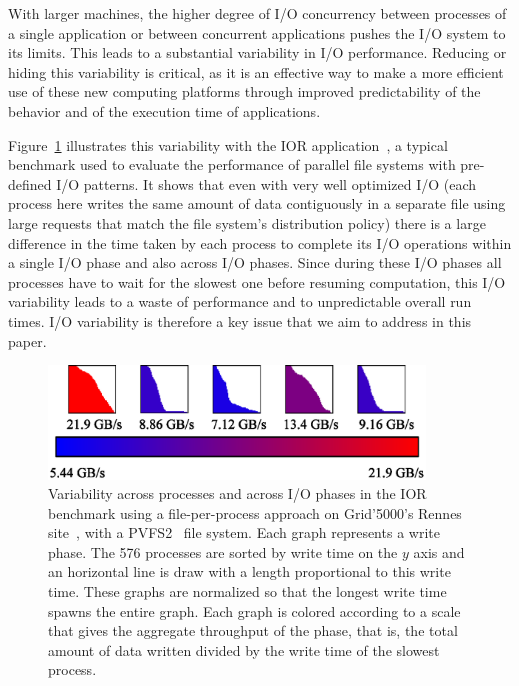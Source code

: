 			With larger machines, the higher degree of I/O concurrency between processes of a single application
			or between concurrent applications pushes the I/O system to its limits. This
			leads to a substantial variability in I/O performance.
			Reducing or hiding this variability is critical, as it is an effective way to make
			a more efficient use of these new computing platforms through improved
			predictability of the behavior and of the execution time of applications.
			
			Figure~\ref{fig:ior:variability} illustrates this variability with the IOR application~\cite{shan2007using},
			a typical benchmark used to evaluate the performance of parallel file systems with pre-defined
			I/O patterns. It shows that even with very well optimized I/O (each process here writes the same amount
			of data contiguously in a separate file using large requests that match the file system's distribution policy) 
			there is a large difference in the time taken by each
			process to complete its I/O operations within a single I/O phase and also across I/O phases.
			Since during these I/O phases all processes have to wait for the slowest one before resuming computation, 
			this I/O variability leads to a waste of performance and to unpredictable overall run times.
			I/O variability is therefore a key issue that we aim to address in this paper.
			
			\begin{figure}
				\begin{center}
				\includegraphics[width=10cm]{figures/variability.eps}
				\caption[somthing]{Variability across processes and across I/O phases in the IOR benchmark using a file-per-process approach
				on Grid'5000's Rennes site~\protect\cite{grid5000}, with a PVFS2~\protect\cite{carns2000pvfs} file system.
				Each graph represents a write phase. The 576 processes are sorted by write time on the $y$ axis and
				an horizontal line is draw with a length proportional to this write time. These graphs are normalized
				so that the longest write time spawns the entire graph. Each graph is colored according to
				a scale that gives the aggregate throughput of the phase, that is, the total amount
				of data written divided by the write time of the slowest process.\footnotemark}\label{fig:ior:variability}
				\end{center}
			\end{figure}
			
